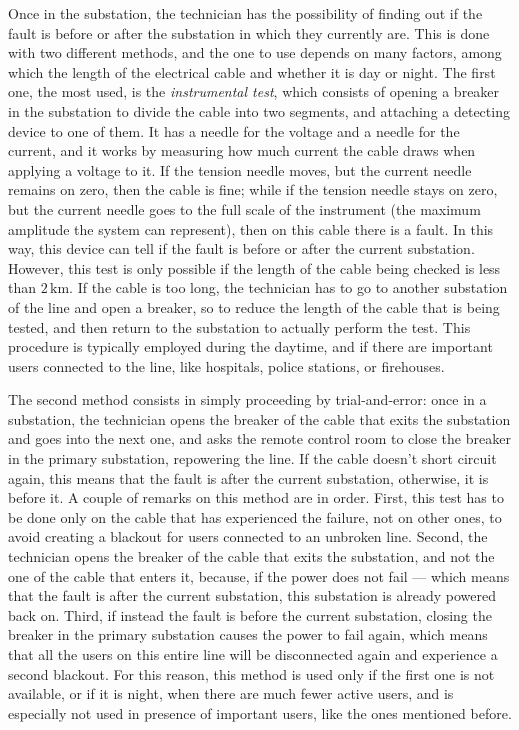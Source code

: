 Once in the substation, the technician has the possibility of finding out if the fault is before or after the substation in which they currently are. This is done with two different methods, and the one to use depends on many factors, among which the length of the electrical cable and whether it is day or night. The first one, the most used, is the \emph{instrumental test}, which consists of opening a breaker in the substation to divide the cable into two segments, and attaching a detecting device to one of them. It has a needle for the voltage and a needle for the current, and it works by measuring how much current the cable draws when applying a voltage to it. If the tension needle moves, but the current needle remains on zero, then the cable is fine; while if the tension needle stays on zero, but the current needle goes to the full scale of the instrument (the maximum amplitude the system can represent), then on this cable there is a fault. In this way, this device can tell if the fault is before or after the current substation. However, this test is only possible if the length of the cable being checked is less than $2 \, \mathrm{km}$. If the cable is too long, the technician has to go to another substation of the line and open a breaker, so to reduce the length of the cable that is being tested, and then return to the substation to actually perform the test. This procedure is typically employed during the daytime, and if there are important users connected to the line, like hospitals, police stations, or firehouses.

The second method consists in simply proceeding by trial-and-error: once in a substation, the technician opens the breaker of the cable that exits the substation and goes into the next one, and asks the remote control room to close the breaker in the primary substation, repowering the line. If the cable doesn't short circuit again, this means that the fault is after the current substation, otherwise, it is before it. A couple of remarks on this method are in order. First, this test has to be done only on the cable that has experienced the failure, not on other ones, to avoid creating a blackout for users connected to an unbroken line. Second, the technician opens the breaker of the cable that exits the substation, and not the one of the cable that enters it, because, if the power does not fail --- which means that the fault is after the current substation, this substation is already powered back on.
Third, if instead the fault is before the current substation, closing the breaker in the primary substation causes the power to fail again, which means that all the users on this entire line will be disconnected again and experience a second blackout. For this reason, this method is used only if the first one is not available, or if it is night, when there are much fewer active users, and is especially not used in presence of important users, like the ones mentioned before.

